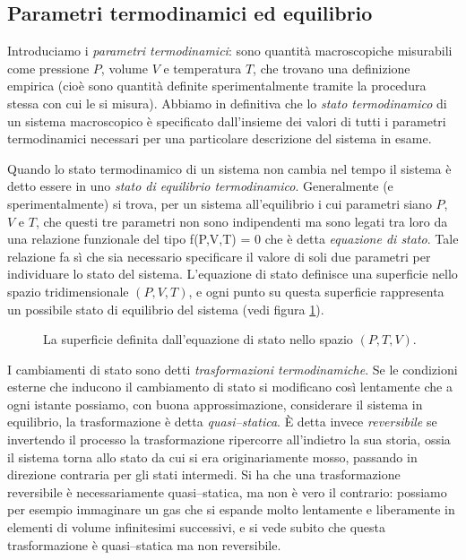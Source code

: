 \subsection{Parametri termodinamici ed equilibrio}
\label{sec:01-par}

Introduciamo i {\em parametri termodinamici}: sono quantità macroscopiche misurabili come pressione $P$, volume $V$ e temperatura $T$, che trovano una definizione empirica (cioè sono quantità definite sperimentalmente tramite la procedura stessa con cui le si misura). Abbiamo in definitiva che lo {\em stato termodinamico} di un sistema macroscopico è specificato dall'insieme dei valori di tutti i parametri termodinamici necessari per una particolare descrizione del sistema in esame.

Quando lo stato termodinamico di un sistema non cambia nel tempo il sistema è detto essere in uno {\em stato di equilibrio termodinamico}. Generalmente (e sperimentalmente) si trova, per un sistema all'equilibrio i cui parametri siano $P$, $V$ e $T$, che questi tre parametri non sono indipendenti ma sono legati tra loro da una relazione funzionale del tipo
\be
\label{eq:01-stato_termo}
f(P,V,T) = 0
\ee
che è detta {\em equazione di stato}. Tale relazione fa sì che sia necessario specificare il valore di soli due parametri per individuare lo stato del sistema. L'equazione di stato definisce una superficie nello spazio tridimensionale $(P,V,T)$, e ogni punto su questa superficie rappresenta un possibile stato di equilibrio del sistema (vedi figura \ref{fig:01-eq-stato}).

\begin{figure}[!ht]
  \centering
  
  \caption{La superficie definita dall'equazione di stato nello spazio $(P,T,V)$.}
  \label{fig:01-eq-stato}  
\end{figure}

I cambiamenti di stato sono detti {\em trasformazioni termodinamiche}. Se le condizioni esterne che inducono il cambiamento di stato si modificano così lentamente che a ogni istante possiamo, con buona approssimazione, considerare il sistema in equilibrio, la trasformazione è detta {\em quasi--statica}. \`E detta invece {\em reversibile} se invertendo il  processo la trasformazione ripercorre all'indietro la sua storia, ossia il sistema torna allo stato da cui si era originariamente mosso, passando in direzione contraria per gli stati intermedi. Si ha che una trasformazione reversibile è necessariamente quasi--statica, ma non è vero il contrario: possiamo per esempio immaginare un gas che si espande molto lentamente e liberamente in elementi di volume infinitesimi successivi, e si vede subito che questa trasformazione è quasi--statica ma non reversibile.

